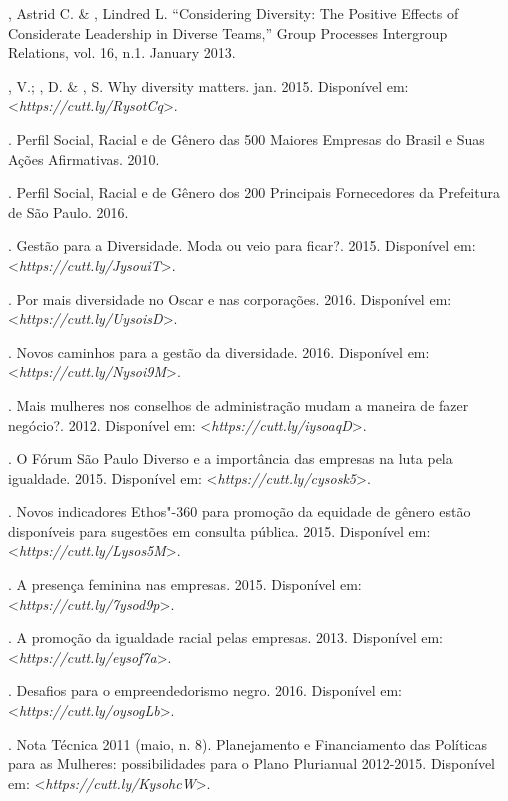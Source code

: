 \begin{bibliohedra}
, Astrid C. \& , Lindred L. ``Considering Diversity: The
Positive Effects of Considerate Leadership in Diverse Teams,'' Group
Processes Intergroup Relations, vol. 16, n.1. January 2013.

, V.; , D. \& , S. Why diversity matters. jan. 2015.
Disponível em: \textless{}\emph{https://cutt.ly/RysotCq}\textgreater{}.

. Perfil Social, Racial e de Gênero
das 500 Maiores Empresas do Brasil e Suas Ações Afirmativas. 2010.

. Perfil Social, Racial e
de Gênero dos 200 Principais Fornecedores da Prefeitura de São Paulo.
2016.

. Gestão para a Diversidade. Moda ou veio para ficar?.
2015.
Disponível em: \textless{}\emph{https://cutt.ly/JysouiT}\textgreater{}.

\titidem. Por mais diversidade no Oscar e nas corporações. 2016.
Disponível em: \textless{}\emph{https://cutt.ly/UysoisD}\textgreater{}.

\titidem. Novos caminhos para a gestão da diversidade. 2016.
Disponível em: \textless{}\emph{https://cutt.ly/Nysoi9M}\textgreater{}.

\titidem. Mais mulheres nos conselhos de administração mudam a
maneira de fazer negócio?. 2012.
Disponível em: \textless{}\emph{https://cutt.ly/iysoaqD}\textgreater{}.

\titidem. O Fórum São Paulo Diverso e a importância das empresas
na luta pela igualdade. 2015.
Disponível em: \textless{}\emph{https://cutt.ly/cysosk5}\textgreater{}.

\titidem. Novos indicadores Ethos"-360 para promoção da equidade
de gênero estão disponíveis para sugestões em consulta pública. 2015.
Disponível em: \textless{}\emph{https://cutt.ly/Lysos5M}\textgreater{}.

\titidem. A presença feminina nas empresas. 2015.
Disponível em: \textless{}\emph{https://cutt.ly/7ysod9p}\textgreater{}.

\titidem. A promoção da igualdade racial pelas empresas. 2013.
Disponível em: \textless{}\emph{https://cutt.ly/eysof7a}\textgreater{}.

. Desafios para o empreendedorismo negro. 2016.
Disponível em: \textless{}\emph{https://cutt.ly/oysogLb}\textgreater{}.

. Nota Técnica  2011 (maio, n. 8). Planejamento e Financiamento
das Políticas para as Mulheres: possibilidades para o Plano Plurianual
2012-2015.
Disponível em: \textless{}\emph{https://cutt.ly/KysohcW}\textgreater{}.


\end{bibliohedra}
